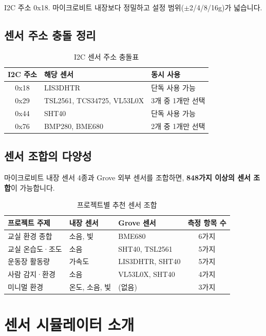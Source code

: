 \documentclass[11pt, a4paper]{article}
\begin{document}
I2C 주소 0x18. 마이크로비트 내장보다 정밀하고 설정 범위($\pm$2/4/8/16g)가 넓습니다.

\subsection{센서 주소 충돌 정리}

\begin{table}[H]\centering
\caption{I2C 센서 주소 충돌표}
\begin{tabular}{cll}\toprule
\textbf{I2C 주소} & \textbf{해당 센서} & \textbf{동시 사용} \\\midrule
0x18 & LIS3DHTR & 단독 사용 가능 \\
0x29 & TSL2561, TCS34725, VL53L0X & 3개 중 1개만 선택 \\
0x44 & SHT40 & 단독 사용 가능 \\
0x76 & BMP280, BME680 & 2개 중 1개만 선택 \\
\bottomrule
\end{tabular}
\end{table}

\subsection{센서 조합의 다양성}

마이크로비트 내장 센서 4종과 Grove 외부 센서를 조합하면, \textbf{848가지 이상의 센서 조합}이 가능합니다.

\begin{table}[H]\centering
\caption{프로젝트별 추천 센서 조합}
\begin{tabular}{p{3.5cm}p{2.5cm}p{4cm}c}\toprule
\textbf{프로젝트 주제} & \textbf{내장 센서} & \textbf{Grove 센서} & \textbf{측정 항목 수} \\\midrule
교실 환경 종합 & 소음, 빛 & BME680 & 6가지 \\
교실 온습도·조도 & 소음 & SHT40, TSL2561 & 5가지 \\
운동장 활동량 & 가속도 & LIS3DHTR, SHT40 & 5가지 \\
사람 감지·환경 & 소음 & VL53L0X, SHT40 & 4가지 \\
미니멀 환경 & 온도, 소음, 빛 & (없음) & 3가지 \\
\bottomrule
\end{tabular}
\end{table}

\section{센서 시뮬레이터 소개}
\end{document}
